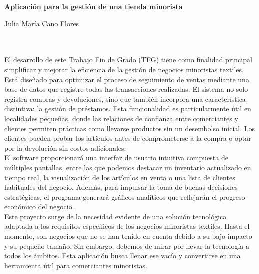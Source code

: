 


\cleardoublepage

\begin{center}
{\large\bfseries Aplicación para la gestión de una tienda minorista}\\
\end{center}
\begin{center}
Julia María Cano Flores\\
\end{center}

\vspace{0.7cm}
\\

\vspace{0.7cm}
\\

El desarrollo de este Trabajo Fin de Grado (TFG) tiene como finalidad principal simplificar y mejorar la eficiencia de la gestión de negocios minoristas textiles. Está diseñado para optimizar el proceso de seguimiento de ventas mediante una base de datos que registre todas las transacciones realizadas. El sistema no solo registra compras y devoluciones, sino que también incorpora una característica distintiva: la gestión de préstamos. Esta funcionalidad es particularmente útil en localidades pequeñas, donde las relaciones de confianza entre comerciantes y clientes permiten prácticas como llevarse productos sin un desembolso inicial. Los clientes pueden probar los artículos antes de comprometerse a la compra o optar por la devolución sin costos adicionales.\\


El software proporcionará una interfaz de usuario intuitiva compuesta de múltiples pantallas, entre las que podemos destacar un inventario actualizado en tiempo real, la visualización de los artículos en venta o una lista de clientes habituales del negocio. Además, para impulsar la toma de buenas decisiones estratégicas, el programa generará gráficos analíticos que reflejarán el progreso económico del negocio. \\

Este proyecto surge de la necesidad evidente de una solución tecnológica adaptada a los requisitos específicos de los negocios minoristas textiles. Hasta el momento, son negocios que no se han tenido en cuenta debido a su bajo impacto y su pequeño tamaño. Sin embargo, debemos de mirar por llevar la tecnología a todos los ámbitos. Esta aplicación busca llenar ese vacío y convertirse en una herramienta útil para comerciantes minoristas.  


